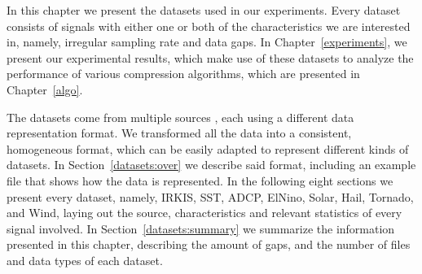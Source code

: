 







In this chapter we present the datasets used in our experiments. Every dataset consists of signals with either one or both of the characteristics we are interested in, namely, irregular sampling rate and data gaps. In Chapter~\ref{experiments}, we present our experimental results, which make use of these datasets to analyze the performance of various compression algorithms, which are presented in Chapter~\ref{algo}.


The datasets come from multiple sources \dataCite, each using a different data representation format. We transformed all the data into a consistent, homogeneous format, which can be easily adapted to represent different kinds of datasets. In Section~\ref{datasets:over} we describe said format, including an example file that shows how the data is represented. In the following eight sections we present every dataset, namely, IRKIS, SST, ADCP, ElNino, Solar, Hail, Tornado, and Wind, laying out the source, characteristics and relevant statistics of every signal involved. In Section~\ref{datasets:summary} we summarize the information presented in this chapter, describing the amount of gaps, and the number of files and data types of each dataset. 

